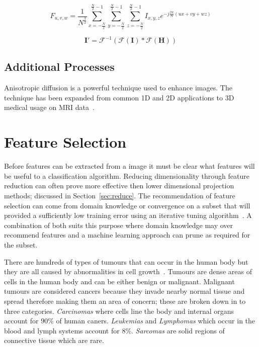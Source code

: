 \documentclass[journal]{IEEEtran}
\begin{document}
\begin{equation}
	F_{u,v,w} = \frac{1}{N^{\frac{3}{2}}} \sum\limits_{x=-\frac{N}{2}}^{\frac{N}{2}-1}\sum\limits_{y=-\frac{N}{2}}^{\frac{N}{2}-1}\sum\limits_{z=-\frac{N}{2}}^{\frac{N}{2}-1}I_{x,y,z}e^{-j\frac{2\pi}{N}(ux + vy + wz)}
	\label{eqn:dft} 
\end{equation}


\begin{equation}
	\textbf{I}' = \mathcal{F}^{-1}(\mathcal{F}(\textbf{I})*\mathcal{F}(\textbf{H}))	%
	\label{eqn:same} 
\end{equation}


\subsection{Additional Processes}
Anisotropic diffusion is a powerful technique used to enhance images.
The technique has been expanded from common 1D and 2D applications to 3D medical usage on MRI data~\cite{greig92nonlinear}.





\section{Feature Selection}
\label{sec:selection}
Before features can be extracted from a image it must be clear what features will be useful to a classification algorithm.
Reducing dimensionality through feature reduction can often prove more effective then lower dimensional projection methods; discussed in Section~\ref{sec:reduce}.
The recommendation of feature selection can come from domain knowledge or convergence on a subset that will provided a sufficiently low training error using an iterative tuning algorithm~\cite{bu07feature,li10tumor}.
A combination of both suits this purpose where domain knowledge may over recommend features and a machine learning approach can prune as required for the subset.  


There are hundreds of types of tumours that can occur in the human body but they are all caused by abnormalities in cell growth~\cite{cooper1992cancer}.
Tumours are dense areas of cells in the human body and can be either benign or malignant.
Malignant tumours are considered cancers because they invade nearby normal tissue and spread therefore making them an area of concern; these are broken down in to three categories.
\emph{Carcinomas} where cells line the body and internal organs account for $90$\% of human caners.
\emph{Leukemias} and \emph{Lymphomas} which occur in the blood and lymph systems account for $8$\%.
\emph{Sarcomas} are solid regions of connective tissue which are rare.
\end{document}

